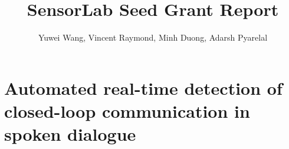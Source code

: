 \documentclass[oneside,9pt]{memoir}
\title{SensorLab Seed Grant Report}
\author{Yuwei Wang, Vincent Raymond, Minh Duong, Adarsh Pyarelal}
\begin{document}
\thispagestyle{empty}
\maketitle
\tableofcontents* 


\chapter{Automated real-time detection of closed-loop communication in spoken dialogue}




\printbibliography
\end{document}

